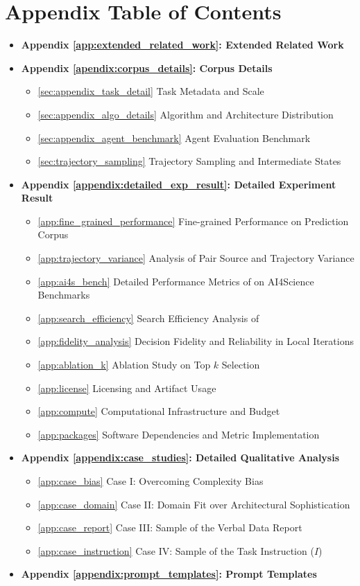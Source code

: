 \section*{Appendix Table of Contents}
\begin{itemize}
    \item \textbf{Appendix \ref{app:extended_related_work}: Extended Related Work}
    \item \textbf{Appendix \ref{apendix:corpus_details}: Corpus Details}
    \begin{itemize}
        \item \ref{sec:appendix_task_detail} Task Metadata and Scale
        \item \ref{sec:appendix_algo_details} Algorithm and Architecture Distribution
        \item \ref{sec:appendix_agent_benchmark} Agent Evaluation Benchmark
        \item \ref{sec:trajectory_sampling} Trajectory Sampling and Intermediate States
    \end{itemize}
    \item \textbf{Appendix \ref{appendix:detailed_exp_result}: Detailed Experiment Result}
    \begin{itemize}
        \item \ref{app:fine_grained_performance} Fine-grained Performance on Prediction Corpus
        \item \ref{app:trajectory_variance} Analysis of Pair Source and Trajectory Variance
        \item \ref{app:ai4s_bench} Detailed Performance Metrics of \ours on AI4Science Benchmarks
        \item \ref{app:search_efficiency} Search Efficiency Analysis of \ours
        \item \ref{app:fidelity_analysis} Decision Fidelity and Reliability in Local Iterations
        \item \ref{app:ablation_k} Ablation Study on Top $k$ Selection
        \item \ref{app:license} Licensing and Artifact Usage
        \item \ref{app:compute} Computational Infrastructure and Budget
        \item \ref{app:packages} Software Dependencies and Metric Implementation
    \end{itemize}
    \item \textbf{Appendix \ref{appendix:case_studies}: Detailed Qualitative Analysis}
    \begin{itemize}
        \item \ref{app:case_bias} Case I: Overcoming Complexity Bias
        \item \ref{app:case_domain} Case II: Domain Fit over Architectural Sophistication
        \item \ref{app:case_report} Case III: Sample of the Verbal Data Report
        \item \ref{app:case_instruction} Case IV: Sample of the Task Instruction ($I$)
    \end{itemize}
    \item \textbf{Appendix \ref{appendix:prompt_templates}: Prompt Templates}
\end{itemize}
